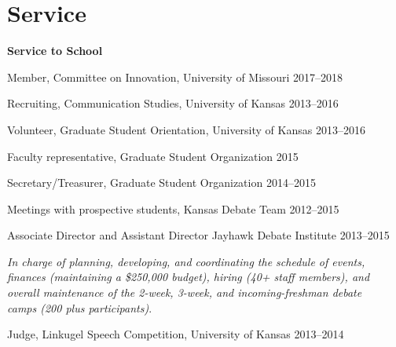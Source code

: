 \documentclass[11pt,letterpaper]{article}
\begin{document}
\section{Service}
\textbf{Service to School}
\begin{innerlist}
  \item Member, Committee on Innovation, University of Missouri \hfill 2017--2018
  \item Recruiting, Communication Studies, University of Kansas \hfill 2013--2016
  \item Volunteer, Graduate Student Orientation, University of Kansas \hfill 2013--2016
  \item Faculty representative, Graduate Student Organization \hfill 2015
  \item Secretary/Treasurer, Graduate Student Organization \hfill 2014--2015
  \item Meetings with prospective students, Kansas Debate Team \hfill 2012--2015
  \item Associate Director and Assistant Director Jayhawk Debate Institute \hfill 2013--2015
    \begin{outerlist}
    \item[]\textit{In charge of planning, developing, and coordinating the schedule of events,\\
        finances (maintaining a \$250,000 budget), hiring (40+ staff members), and\\
        overall maintenance of the 2-week, 3-week, and incoming-freshman debate \\
        camps (200 plus participants)}.
    \end{outerlist}
   \vspace{1em}
  \item Judge, Linkugel Speech Competition, University of Kansas \hfill 2013--2014
  \item[]
\end{innerlist}
\end{document}
